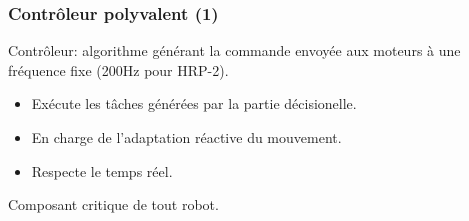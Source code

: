 \documentclass[14pt,utf8,hyperref={pdfpagelabels=false}]{beamer}
\begin{document}

\begin{frame}[plain]
  \begin{changemargin}{-1cm}{-1cm}
    \begin{center}
      \vspace{-0.1cm}
    \end{center}
  \end{changemargin}
\end{frame}

\begin{slideAction}
  \frametitle{Contrôleur polyvalent (1)}


  \begin{changeleftmargin}{1.1cm}
  \begin{center}
    Contrôleur: algorithme générant la commande envoyée aux moteurs à
    une fréquence fixe (200Hz pour HRP-2).

    \bigskip

    \begin{itemize}
    \item Exécute les tâches générées par la partie décisionelle.
    \item En charge de l'adaptation réactive du mouvement.
    \item Respecte le temps réel.
    \end{itemize}

    \bigskip

    Composant \alert{critique} de tout robot.
  \end{center}
  \end{changeleftmargin}
\end{slideAction}
\end{document}

